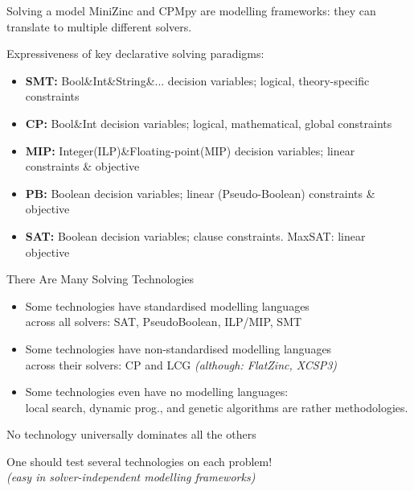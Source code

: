\documentclass{cons-beamer}
\begin{document}
\begin{frame}{Solving a model}
  MiniZinc and CPMpy are  modelling frameworks: they can translate to multiple different solvers. \vfill

  Expressiveness of key declarative solving paradigms:
  {\small
  \begin{itemize}
  	\item \textbf{SMT:} Bool\&Int\&String\&... decision variables; logical, theory-specific constraints
  	\item \textbf{CP:} Bool\&Int decision variables; logical, mathematical, global constraints
  	\item \textbf{MIP:} Integer(ILP)\&Floating-point(MIP) decision variables; linear constraints \& objective
  	\item \textbf{PB:} Boolean decision variables; linear (Pseudo-Boolean) constraints \& objective
    \item \textbf{SAT:} Boolean decision variables; clause constraints. MaxSAT: linear objective
  \end{itemize}
  }
\end{frame}

\begin{frame}{There Are Many Solving Technologies}
  \begin{itemize}
  \item Some technologies have \alert{standardised} modelling languages \\ 
        across all solvers: SAT, PseudoBoolean, ILP/MIP, SMT \vfill
  \item Some technologies have \alert{non-standardised} modelling languages \\ 
        across their solvers: CP and LCG \textit{(although: FlatZinc, XCSP3)} \vfill
    
  \item Some technologies even have \alert{no} modelling languages: \\ 
        local search, dynamic prog., and genetic algorithms are rather methodologies. \vfill
  \end{itemize}
  
  No technology universally dominates all the others \vfill
  
  One should test several technologies on each problem! \\
  \textit{(easy in solver-independent modelling frameworks)}
\end{frame}
\end{document}

